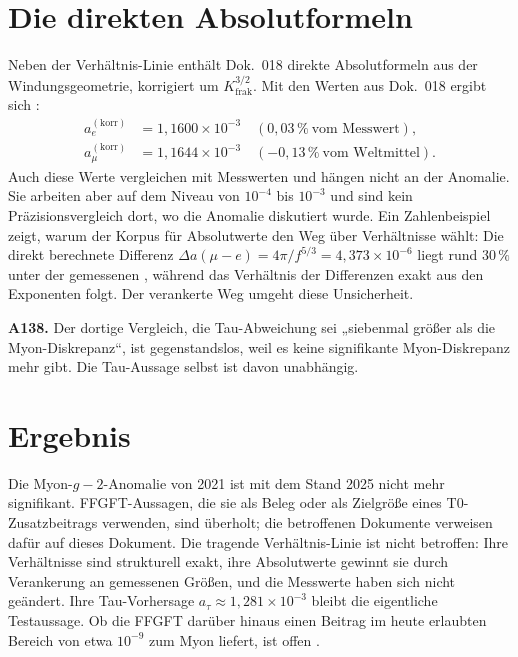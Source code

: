 \section{Die direkten Absolutformeln}
Neben der Verhältnis-Linie enthält Dok.~018 direkte Absolutformeln aus der
Windungsgeometrie, korrigiert um $K_\mathrm{frak}^{3/2}$. Mit den Werten aus Dok.~018
ergibt sich \KM:
\begin{align*}
  a_e^{(\mathrm{korr})} &= 1{,}1600\times10^{-3}\quad(0{,}03\,\%\ \text{vom Messwert}),\\
  a_\mu^{(\mathrm{korr})} &= 1{,}1644\times10^{-3}\quad(-0{,}13\,\%\ \text{vom Weltmittel}).
\end{align*}
Auch diese Werte vergleichen mit Messwerten und hängen nicht an der Anomalie. Sie
arbeiten aber auf dem Niveau von $10^{-4}$ bis $10^{-3}$ und sind kein
Präzisionsvergleich dort, wo die Anomalie diskutiert wurde. Ein Zahlenbeispiel zeigt,
warum der Korpus für Absolutwerte den Weg über Verhältnisse wählt: Die direkt
berechnete Differenz $\Delta a(\mu{-}e)=4\pi/f^{5/3}=4{,}373\times10^{-6}$ liegt rund
$30\,\%$ unter der gemessenen \KM, während das Verhältnis der Differenzen exakt aus den
Exponenten folgt. Der verankerte Weg umgeht diese Unsicherheit.

\textbf{A138.} Der dortige Vergleich, die Tau-Abweichung sei „siebenmal größer als die
Myon-Diskrepanz``, ist gegenstandslos, weil es keine signifikante Myon-Diskrepanz mehr
gibt. Die Tau-Aussage selbst ist davon unabhängig.

\section{Ergebnis}
Die Myon-$g-2$-Anomalie von 2021 ist mit dem Stand 2025 nicht mehr signifikant.
FFGFT-Aussagen, die sie als Beleg oder als Zielgröße eines T0-Zusatzbeitrags
verwenden, sind überholt; die betroffenen Dokumente verweisen dafür auf dieses Dokument. Die tragende
Verhältnis-Linie ist nicht betroffen: Ihre Verhältnisse sind strukturell exakt, ihre
Absolutwerte gewinnt sie durch Verankerung an gemessenen Größen, und die Messwerte
haben sich nicht geändert. Ihre Tau-Vorhersage $a_\tau\approx1{,}281\times10^{-3}$
bleibt die eigentliche Testaussage. Ob die FFGFT darüber hinaus einen Beitrag im heute
erlaubten Bereich von etwa $10^{-9}$ zum Myon liefert, ist offen \SM.

